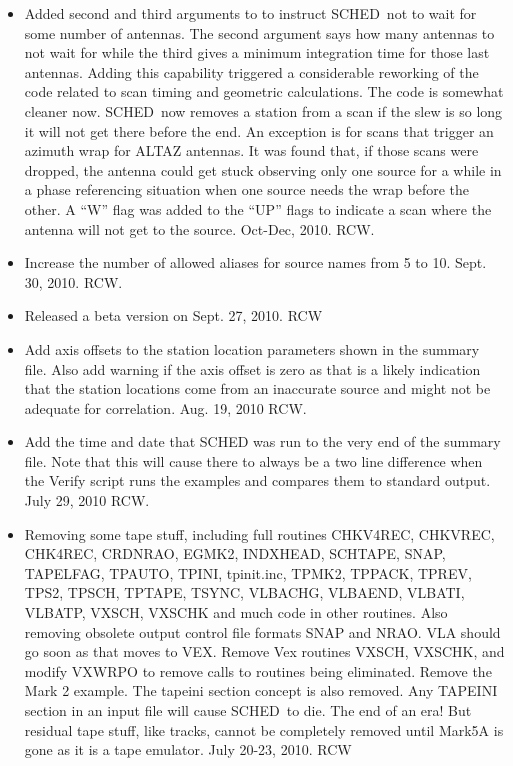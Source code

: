\documentclass{report}
\newcommand{\schedb}{{\sc SCHED~}}
\begin{document}
\begin{itemize}
\item Added second and third arguments to  to instruct \schedb not to wait for some number of
antennas.  The second argument says how many antennas to not wait for
while the third gives a minimum integration time for those last antennas.
Adding this capability triggered a considerable reworking of the code
related to scan timing and geometric calculations.  The code is somewhat
cleaner now.  \schedb now removes a station from a scan if the slew is
so long it will not get there before the end.  An exception is for
scans that trigger an azimuth wrap for ALTAZ antennas.  It was found
that, if those scans were dropped, the antenna could get stuck observing
only one source for a while in a phase referencing situation when one
source needs the wrap before the other.  A ``W'' flag was added to the
``UP'' flags to indicate a scan where the antenna will not get to the
source.  Oct-Dec, 2010.  RCW.

\item Increase the number of allowed aliases for source names from
5 to 10.  Sept. 30, 2010.  RCW.

\item Released a beta version on Sept. 27, 2010.  RCW

\item Add axis offsets to the station location parameters shown
in the summary file.  Also add warning if the axis offset is zero
as that is a likely indication that the station locations come
from an inaccurate source and might not be adequate for correlation.
Aug. 19, 2010  RCW.

\item Add the time and date that SCHED was run to the very end of
the summary file.  Note that this will cause there to always
be a two line difference when the Verify script runs the examples
and compares them to standard output.  July 29, 2010  RCW.

\item Removing some tape stuff, including full routines CHKV4REC,
CHKVREC, CHK4REC, CRDNRAO, EGMK2, INDXHEAD, SCHTAPE, SNAP, TAPELFAG,
TPAUTO, TPINI, tpinit.inc, TPMK2, TPPACK, TPREV, TPS2, TPSCH, TPTAPE,
TSYNC, VLBACHG, VLBAEND, VLBATI, VLBATP, VXSCH, VXSCHK and much code
in other routines.  Also removing obsolete output control file formats
SNAP and NRAO.  VLA should go soon as that moves to VEX.  Remove Vex
routines VXSCH, VXSCHK, and modify VXWRPO to remove calls to routines
being eliminated.  Remove the Mark 2 example.  The tapeini section
concept is also removed.  Any TAPEINI section in an input file will
cause \schedb to die.  The end of an era!  But residual tape stuff,
like tracks, cannot be completely removed until Mark5A is gone as
it is a tape emulator.  July 20-23, 2010.  RCW


\end{itemize}
\end{document}
